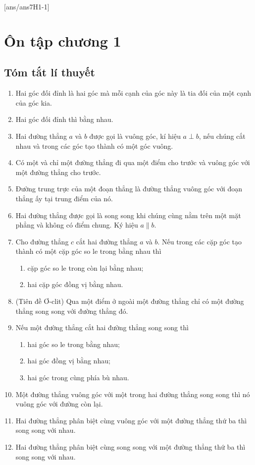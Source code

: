 [ans/ans7H1-1]
\section{Ôn tập chương 1}
\subsection{Tóm tắt lí thuyết}
		\begin{enumerate}[\tickEX]
		\item Hai góc đối đỉnh là hai góc mà mỗi cạnh của góc này là tia đối của một cạnh của góc kia.
		\item Hai góc đối đỉnh thì bằng nhau.
		\item Hai đường thẳng $a$ và $b$ được gọi là vuông góc, kí hiệu $a \perp b$, nếu chúng cắt nhau và trong các góc tạo thành có một góc vuông.
		\item Có một và chỉ một đường thẳng đi qua một điểm cho trước và vuông góc với một đường thẳng cho trước.
		\item Đường trung trực của một đoạn thẳng là đường thẳng vuông góc với đoạn thẳng ấy tại trung điểm của nó.
		\item Hai đường thẳng được gọi là song song khi chúng cùng nằm trên một mặt phẳng và không có điểm chung. Ký hiệu $a \parallel b.$
		\item Cho đường thẳng $c$ cắt hai đường thẳng $a$ và $b$. Nếu trong các cặp góc tạo thành có một cặp góc so le trong bằng nhau thì
		\begin{enumerate}
			\item cặp góc so le trong còn lại bằng nhau;
			\item hai cặp góc đồng vị bằng nhau.
		\end{enumerate}
	   	\item (Tiên đề Ơ-clit) Qua một điểm ở ngoài một đường thẳng chỉ có một đường thẳng song song với đường thẳng đó.
	   	\item Nếu một đường thẳng cắt hai đường thẳng song song thì
	   	\begin{enumerate}
	   		\item hai góc so le trong bằng nhau;
	   		\item hai góc đồng vị bằng nhau;
	   		\item hai góc trong cùng phía bù nhau.
	   	\end{enumerate}
		\item Một đường thẳng vuông góc với một trong hai đường thẳng song song thì nó vuông góc với đường còn lại.
		\item Hai đường thẳng phân biệt cùng vuông góc với một đường thẳng thứ ba thì song song với nhau.
		\item  Hai đường thẳng phân biệt cùng song song với một đường thẳng thứ ba thì song song với nhau.


\end{enumerate}
